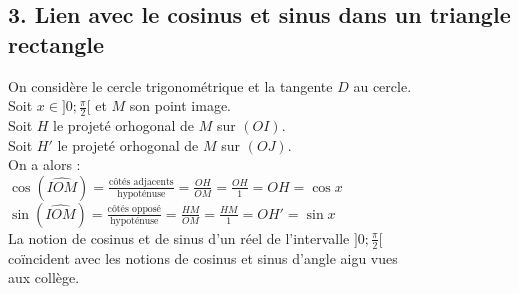 \documentclass[11pt,a4paper]{article}
\begin{document}
\subsection*{3. Lien avec le cosinus et sinus dans un triangle rectangle}


\begin{minipage}{0.6\textwidth}
    On considère le cercle trigonométrique et la tangente $D$ au cercle. \\
    Soit $x\in]0;\frac{\pi}{2}[$ et $M$ son point image. \\
                Soit $H$ le projeté orhogonal de $M$ sur $(OI)$. \\
                Soit $H'$ le projeté orhogonal de $M$ sur $(OJ)$. \\

                On a alors : \\
            $\cos(\widehat{IOM})=\frac{\text{côtés adjacents}}{\text{hypoténuse}}=\frac{OH}{OM}=\frac{OH}{1}=OH=\cos{x}$ \\
            $\sin(\widehat{IOM})=\frac{\text{côtés opposé}}{\text{hypoténuse}}=\frac{HM}{OM}=\frac{HM}{1}=OH'=\sin{x}$ \\

                La notion de cosinus et de sinus d'un réel de l'intervalle $]0;\frac{\pi}{2}[$ \\
    coïncident avec les notions de cosinus et sinus d'angle aigu vues \\ aux  collège.
\end{minipage}
\hfill
\end{document}
